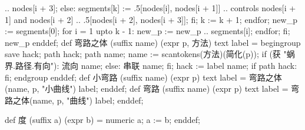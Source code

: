           .. nodes[i + 3];
      else:
        segments[k] := .5[nodes[i], nodes[i + 1]] 
          .. controls nodes[i + 1] and nodes[i + 2] 
          .. .5[nodes[i + 2], nodes[i + 3]];
      fi;
      k := k + 1;
    endfor;
    new_p := segments[0];
    for i = 1 upto k - 1:
      new_p := new_p .. segments[i];
    endfor;
  fi;
  new_p
enddef;
def 弯路之体 (suffix name) (expr p, 方法) text label =
  begingroup
  save hack; path hack;
  path name; name := scantokens(方法)(简化(p));
  if (获 "蜗界.路径.有向"):
    流向 name;
  else:
    串联 name;
  fi;
  hack := label name;
  if path hack: fi;
  endgroup
enddef;
def 小弯路 (suffix name) (expr p) text label =
  弯路之体(name, p, "小曲线") label;
enddef;
def 弯路 (suffix name) (expr p) text label =
  弯路之体(name, p, "曲线") label;
enddef;
\stopMPinclusions

\startMPinclusions[+]
def 度 (suffix a) (expr b) =
  numeric a;
  a := b;
enddef;
\stopMPinclusions
